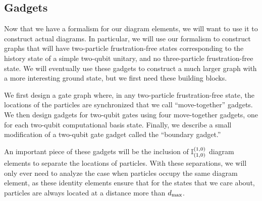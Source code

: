 \documentclass[../thesis-main/thesis-main]{subfiles}
\begin{document}
%
%


\subsection{Gadgets}\label{sec:gadgets}

Now that we have a formalism for our diagram elements, we will want to use it to construct actual diagrams.  In particular, we will use our formalism to construct graphs that will have two-particle frustration-free states corresponding to the history state of a simple two-qubit unitary, and no three-particle frustration-free state.  We will eventually use these gadgets to construct a much larger graph with a more interesting ground state, but we first need these building blocks.

We first design a gate graph where, in any two-particle frustration-free state, the locations of the particles are synchronized that we call ``move-together'' gadgets.  We then design gadgets for two-qubit gates using four move-together gadgets, one for each two-qubit computational basis state. Finally, we describe a small modification of a two-qubit gate gadget called the ``boundary gadget.''

An important piece of these gadgets will be the inclusion of $\mathbb{I}_{(1,0)}^{(1,0)}$ diagram elements to separate the locations of particles.  With these separations, we will only ever need to analyze the case when particles occupy the same diagram element, as these identity elements ensure that for the states that we care about, particles are always located at a distance more than $d_{\text{max}}$.
\end{document}

